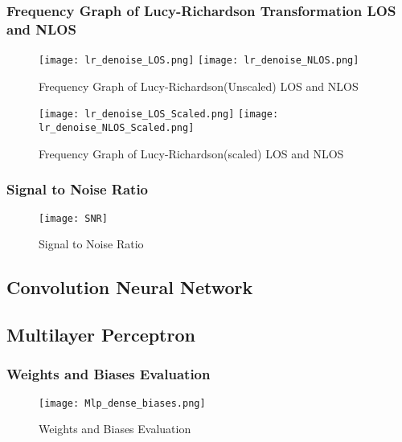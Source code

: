 \documentclass[
	article, %
	11pt, %
	draft, %
]{CSUniSchoolLabReport}
\begin{document}
\subsubsection{Frequency Graph of Lucy-Richardson Transformation LOS and NLOS}\label{frequency_graph_lr}

\begin{figure}[H] 
  \centering
  \texttt{[image: lr\_denoise\_LOS.png]}
  \texttt{[image: lr\_denoise\_NLOS.png]}
  \caption{Frequency Graph of Lucy-Richardson(Unscaled) LOS and NLOS}\label{fig:frequency_graph_lr}
\end{figure}

\begin{figure}[H] 
  \centering
  \texttt{[image: lr\_denoise\_LOS\_Scaled.png]}
  \texttt{[image: lr\_denoise\_NLOS\_Scaled.png]}
  \caption{Frequency Graph of Lucy-Richardson(scaled) LOS and NLOS}\label{fig:frequency_graph_lr_scaled}
\end{figure}

\subsubsection{Signal to Noise Ratio}\label{sur_visual}

\begin{figure}[H] %
	\centering %
	\texttt{[image: SNR]} %
	\caption{Signal to Noise Ratio}\label{fig:snr}
\end{figure}


\subsection{Convolution Neural Network}\label{cnn_visual}

\subsection{Multilayer Perceptron}\label{mlp_visual}

\subsubsection{Weights and Biases Evaluation}\label{Weights_and_biases_visual}

\begin{figure}[H] 
  \centering
  \texttt{[image: Mlp\_dense\_biases.png]}
  \caption{Weights and Biases Evaluation}\label{fig:Weights_and_biases_visual}
\end{figure}
\end{document}
